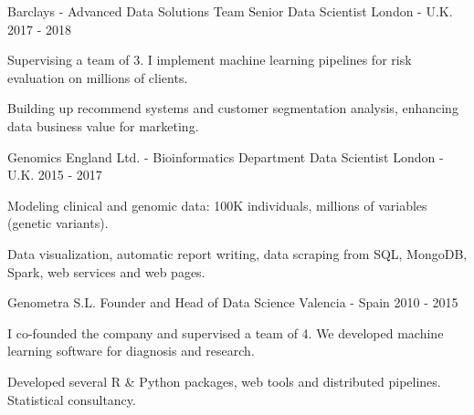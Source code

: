 \begin{cventries}

\cventry
{Barclays - Advanced Data Solutions Team} %
{Senior Data Scientist} %
{London - U.K.} %
{2017 - 2018} %
{ %
\begin{cvitems}
\item {Supervising a team of 3. I implement machine learning pipelines for risk evaluation on millions of clients.}
\item {Building up recommend systems and customer segmentation analysis, enhancing data business value for marketing.}
\end{cvitems}
}


\cventry
{Genomics England Ltd. - Bioinformatics Department} %
{Data Scientist} %
{London - U.K.} %
{2015 - 2017} %
{ %
\begin{cvitems}
\item {Modeling clinical and genomic data: 100K individuals, millions of variables (genetic variants).}
\item {Data visualization, automatic report writing, data scraping from SQL, MongoDB, Spark, web services and web pages.}
\end{cvitems}
}


\cventry
{Genometra S.L.} %
{Founder and Head of Data Science} %
{Valencia - Spain} %
{2010 - 2015} %
{ %
\begin{cvitems}
\item {I co-founded the company and supervised a team of 4. We developed machine learning software for diagnosis and research.}
\item {Developed several R \& Python packages, web tools and distributed pipelines. Statistical consultancy.}
\end{cvitems} 
}


\end{cventries}
